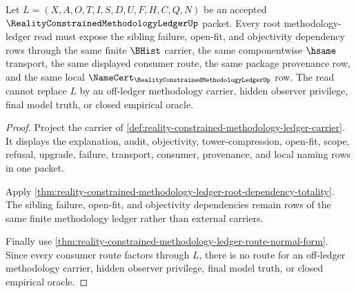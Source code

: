 \begin{theorem}
\label{thm:reality-constrained-methodology-ledger-root-carrier-obligation}
Let $L=(X,A,O,T,I,S,D,U,F,H,C,Q,N)$ be an accepted $\RealityConstrainedMethodologyLedgerUp$ packet. Every root methodology-ledger read must expose the sibling failure, open-fit, and objectivity dependency rows through the same finite $\BHist$ carrier, the same componentwise $\hsame$ transport, the same displayed consumer route, the same package provenance row, and the same local $\NameCert_{\RealityConstrainedMethodologyLedgerUp}$ row. The read cannot replace $L$ by an off-ledger methodology carrier, hidden observer privilege, final model truth, or closed empirical oracle.
\end{theorem}
\begin{proof}
Project the carrier of \autoref{def:reality-constrained-methodology-ledger-carrier}. It displays the explanation, audit, objectivity, tower-compression, open-fit, scope, refusal, upgrade, failure, transport, consumer, provenance, and local naming rows in one packet.

Apply \autoref{thm:reality-constrained-methodology-ledger-root-dependency-totality}. The sibling failure, open-fit, and objectivity dependencies remain rows of the same finite methodology ledger rather than external carriers.

Finally use \autoref{thm:reality-constrained-methodology-ledger-route-normal-form}. Since every consumer route factors through $L$, there is no route for an off-ledger methodology carrier, hidden observer privilege, final model truth, or closed empirical oracle.
\end{proof}

